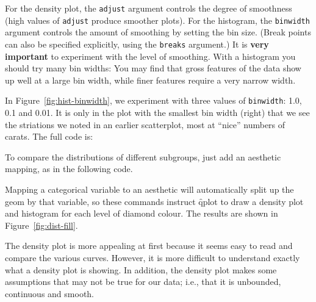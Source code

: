 For the density plot, the {\tt adjust} argument controls the degree of smoothness (high values of {\tt adjust} produce smoother plots). For the histogram, the {\tt binwidth} argument controls the amount of smoothing by setting the bin size.  (Break points can also be specified explicitly, using the {\tt breaks} argument.) It is {\bf very important} to experiment with the level of smoothing.  With a histogram you should try many bin widths: You may find that gross features of the data show up well at a large bin width, while finer features require a very narrow width.

In Figure~\ref{fig:hist-binwidth}, we experiment with three values of {\tt binwidth}: 1.0, 0.1 and 0.01.  It is only in the plot with the smallest bin width (right) that we see the striations we noted in an earlier scatterplot, most at ``nice'' numbers of carats. The full code is:

% 


To compare the distributions of different subgroups, just add an aesthetic mapping, as in the following code.

% 


\noindent Mapping a categorical variable to an aesthetic will automatically split up the geom by that variable, so these commands instruct \f{qplot} to draw a density plot and histogram for each level of diamond colour. The results are shown in Figure~\ref{fig:dist-fill}.  

The density plot is more appealing at first because it seems easy to read and compare the various curves. However, it is more difficult to understand exactly what a density plot is showing.  In addition, the density plot makes some assumptions that may not be true for our data; i.e., that it is unbounded, continuous and smooth.

